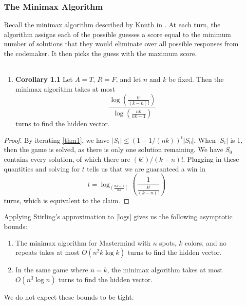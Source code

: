 \documentclass[12pt, a4paper]{article}
\begin{document}
\subsubsection{The Minimax Algorithm} Recall the minimax algorithm described by Knuth in \cite{DK76}.
At each turn, the algorithm assigns each of the possible guesses a score equal
to the minimum number of solutions that they would eliminate over all
possible responses from the codemaker. It then picks the guess with the maximum
score.\\\\
\begin{enumerate}[label=]
	\item\textbf{Corollary 1.1} Let $A=T$, $R = F$, and let $n$ and $k$ be fixed. Then the minimax algorithm takes at most 
	\begin{equation*}\label{logs}
	\frac{\log\left(\frac{k!}{(k-n)!}\right)}{\log\left(\frac{nk}{nk-1}\right)}
	\end{equation*}
	turns to find the hidden vector.	
\end{enumerate}

\begin{proof}
	By iterating \ref{thm1},  %
	we have $|S_t| \leq (1-1/(nk))^t|S_0|$. When $|S_t|$ is 1, then the game is solved, as there is only one solution remaining. We have $S_0$ contains every solution, of which there are $(k!)/(k-n)!$. Plugging in these quantities and solving for $t$ tells us that we are guaranteed a win in   
	\begin{equation*}
	t = \log_{\left(\frac{nk-1}{nk}\right)}\left(\frac{1}{\frac{k!}{(k-n)!}}\right)
	\end{equation*}
	turns, which is equivalent to the claim.
\end{proof}
Applying Stirling's approximation to \ref{logs} gives us the following asymptotic bounds:
\begin{enumerate}[label=\roman*.]
	\item The minimax algorithm for Mastermind with $n$ spots, $k$
	colors, and no repeats takes at most $O(n^2k\log k)$ turns to find the
	hidden vector.
	
	\item In the same game where $n=k$, the minimax algorithm takes at most
	$O(n^3\log n)$ turns to find the hidden vector.
\end{enumerate}
We do not expect these bounds to be tight. 



\clearpage


\end{document}

